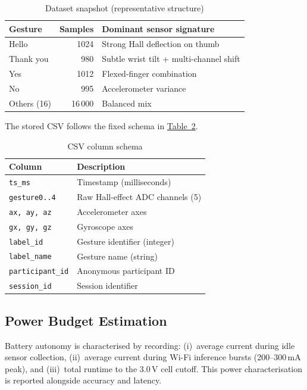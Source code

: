 \documentclass[conference]{IEEEtran}
\newcommand{\TabLink}[1]{\hyperref[#1]{Table~\ref*{#1}}}
\begin{document}
\begin{table}[!t]
  \centering\caption{Dataset snapshot (representative structure)}\label{tab:dataset}
  \begin{tabularx}{\columnwidth}{@{}lrX@{}}
    \toprule Gesture & Samples & Dominant sensor signature \\\midrule
    Hello          & 1024    & Strong Hall deflection on thumb \\
    Thank you      &  980    & Subtle wrist tilt + multi-channel shift \\
    Yes            & 1012    & Flexed-finger combination \\
    No             &  995    & Accelerometer variance \\
    Others (16)    & 16\,000 & Balanced mix \\
    \bottomrule
  \end{tabularx}
\end{table}

The stored CSV follows the fixed schema in \TabLink{tab:csvschema}.

\begin{table}[!t]
  \centering\caption{CSV column schema}\label{tab:csvschema}
  \begin{tabularx}{\columnwidth}{@{}lX@{}}
    \toprule Column & Description \\\midrule
    \texttt{ts\_ms}          & Timestamp (milliseconds) \\
    \texttt{gesture0..4}     & Raw Hall-effect ADC channels (5) \\
    \texttt{ax, ay, az}      & Accelerometer axes \\
    \texttt{gx, gy, gz}      & Gyroscope axes \\
    \texttt{label\_id}       & Gesture identifier (integer) \\
    \texttt{label\_name}     & Gesture name (string) \\
    \texttt{participant\_id} & Anonymous participant ID \\
    \texttt{session\_id}     & Session identifier \\
    \bottomrule
  \end{tabularx}
\end{table}

\subsection{Power Budget Estimation}

Battery autonomy is characterised by recording: (i)~average current during
idle sensor collection, (ii)~average current during Wi-Fi inference bursts
(200--300\,mA peak), and (iii)~total runtime to the 3.0\,V cell cutoff.
This power characterisation is reported alongside accuracy and latency.
\end{document}
